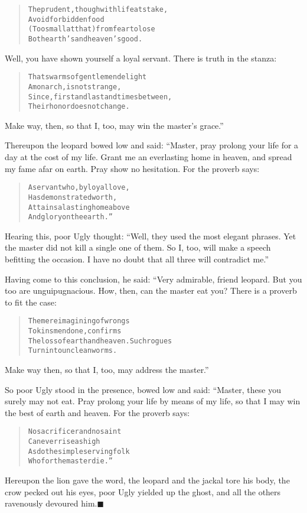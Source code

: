 \documentclass[article, twoside, 14pt]{memoir}
\newcommand{\qed}{\hfill \ensuremath{\blacksquare}}
\renewenvironment{verbatim}{%
\begin{quote}%
\vskip -10pt%
\begin{alltt}\normalfont\large}{\end{alltt}%
\end{quote}%
\vskip -10pt
} %
\begin{document}
\begin{verbatim}
The prudent, though with life at stake,
    Avoid forbidden food
(Too small at that){\textemdash}from fear to lose
    Both earth's and heaven's good.
\end{verbatim}
Well, you have shown yourself a loyal servant. There is truth in
the stanza:

\begin{verbatim}
That swarms of gentlemen delight
    A monarch, is not strange,
Since, first and last and times between,
    Their honor does not change.
\end{verbatim}
Make way, then, so that I, too, may win the master's grace.”

Thereupon the leopard bowed low and said: “Master, pray prolong
your life for a day at the cost of my life. Grant me an everlasting
home in heaven, and spread my fame afar on earth. Pray show no
hesitation. For the proverb says:

\begin{verbatim}
A servant who, by loyal love,
    Has demonstrated worth,
Attains a lasting home above
    And glory on the earth.”
\end{verbatim}
Hearing this, poor Ugly thought:
``Well, they used the most elegant phrases. Yet the master did not kill a single one of them. So I, too, will make a speech befitting the occasion. I have no doubt that all three will contradict me.''

Having come to this conclusion, he said: “Very admirable, friend
leopard. But you too are unguipugnacious. How, then, can the master
eat you? There is a proverb to fit the case:

\begin{verbatim}
The mere imagining of wrongs
    To kinsmen done, confirms
The loss of earth and heaven. Such rogues
    Turn into unclean worms.
\end{verbatim}
Make way then, so that I, too, may address the master.”

So poor Ugly stood in the presence, bowed low and said: “Master,
these you surely may not eat. Pray prolong your life by means of my
life, so that I may win the best of earth and heaven. For the
proverb says:

\begin{verbatim}
No sacrificer and no saint
    Can ever rise as high
As do the simple servingfolk
    Who for the master die.”
\end{verbatim}
Hereupon the lion gave the word, the leopard and the jackal tore
his body, the crow pecked out his eyes, poor Ugly yielded up the
ghost, and all the others ravenously devoured
him.\hyperref[s16]{\qed}
\end{document}
